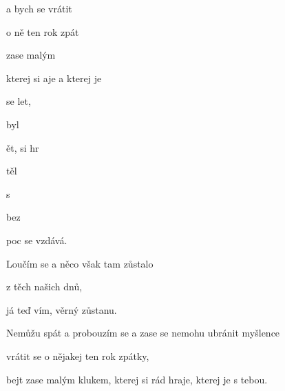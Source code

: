 

\zs
{} a  bych se vrátit

o ně ten rok zpát

 zase malým 

kterej si aje a kterej je  
\ks

\zs
{} se    let,

 byl   

ět,   si hr
\ks

\zs
{} těl  

 s  

     
\ks

\zr
{}  

 bez 

   poc se vzdává.
\kr

\zs
Loučím se a něco však tam zůstalo

z těch našich dnů,

já teď vím, věrný zůstanu.
\ks

\zr  \kr

\zs
Nemůžu spát a probouzím se a zase se nemohu ubránit myšlence

vrátit se o nějakej ten rok zpátky,

bejt zase malým klukem, kterej si rád hraje, kterej je s tebou.
\ks

\kp
